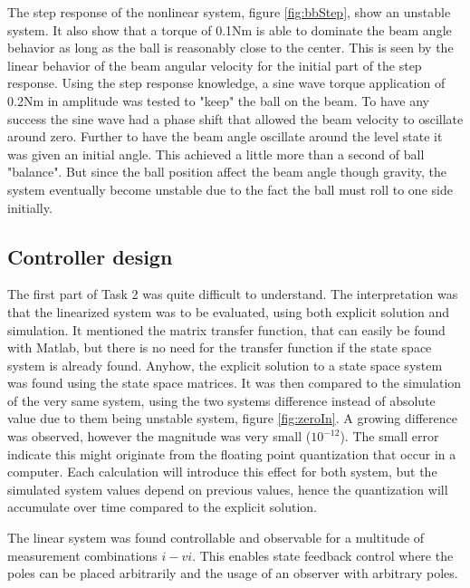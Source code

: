 \documentclass[a4paper, titlepage]{article}
\begin{document}
The step response of the nonlinear system, figure \ref{fig:bbStep}, show an unstable system.
It also show that a torque of 0.1Nm is able to dominate the beam angle behavior as long as the ball is reasonably close to the center.
This is seen by the linear behavior of the beam angular velocity for the initial part of the step response.
Using the step response knowledge, a sine wave torque application of 0.2Nm in amplitude was tested to "keep" the ball on the beam.
To have any success the sine wave had a phase shift that allowed the beam velocity to oscillate around zero.
Further to have the beam angle oscillate around the level state it was given an initial angle.
This achieved a little more than a second of ball "balance".
But since the ball position affect the beam angle though gravity, the system eventually become unstable due to the fact the ball must roll to one side initially. 

\subsection{Controller design}
The first part of Task 2 was quite difficult to understand.
The interpretation was that the linearized system was to be evaluated, using both explicit solution and simulation.
It mentioned the matrix transfer function, that can easily be found with Matlab, but there is no need for the transfer function if the state space system is already found.
Anyhow, the explicit solution to a state space system was found using the state space matrices.
It was then compared to the simulation of the very same system, using the two systems difference instead of absolute value due to them being unstable system, figure \ref{fig:zeroIn}.
A growing difference was observed, however the magnitude was very small ($10^{-12}$).
The small error indicate this might originate from the floating point quantization that occur in a computer.
Each calculation will introduce this effect for both system, but the simulated system values depend on previous values, hence the quantization will accumulate over time compared to the explicit solution.

The linear system was found controllable and observable for a multitude of measurement combinations $i - vi$.
This enables state feedback control where the poles can be placed arbitrarily and the usage of an observer with arbitrary poles.
\end{document}
